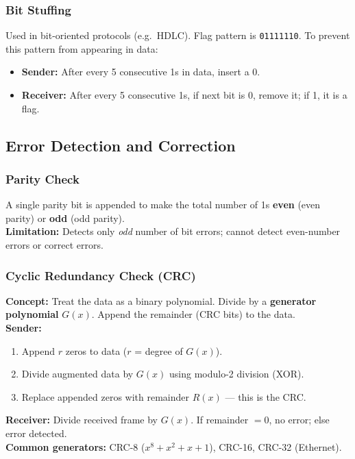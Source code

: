 \documentclass[12pt,a4paper]{article}
\begin{document}
\subsubsection*{Bit Stuffing}
Used in bit-oriented protocols (e.g.\ HDLC). Flag pattern is \texttt{01111110}. To prevent this pattern from appearing in data:
\begin{itemize}[leftmargin=*, itemsep=2pt]
  \item \textbf{Sender:} After every 5 consecutive 1s in data, insert a 0.
  \item \textbf{Receiver:} After every 5 consecutive 1s, if next bit is 0, remove it; if 1, it is a flag.
\end{itemize}

\subsection{Error Detection and Correction}

\subsubsection*{Parity Check}
\begin{tcolorbox}[formulabox, title={\textbf{Parity Check}}]
A single parity bit is appended to make the total number of 1s \textbf{even} (even parity) or \textbf{odd} (odd parity).\\
\textbf{Limitation:} Detects only \textit{odd} number of bit errors; cannot detect even-number errors or correct errors.
\end{tcolorbox}

\subsubsection*{Cyclic Redundancy Check (CRC)}
\begin{tcolorbox}[formulabox, title={\textbf{CRC --- Most Widely Used Error Detection}}]
\textbf{Concept:} Treat the data as a binary polynomial. Divide by a \textbf{generator polynomial} $G(x)$. Append the remainder (CRC bits) to the data.\\[4pt]
\textbf{Sender:}
\begin{enumerate}[label=\arabic*., leftmargin=*, itemsep=2pt, topsep=0pt]
  \item Append $r$ zeros to data ($r$ = degree of $G(x)$).
  \item Divide augmented data by $G(x)$ using modulo-2 division (XOR).
  \item Replace appended zeros with remainder $R(x)$ --- this is the CRC.
\end{enumerate}
\textbf{Receiver:} Divide received frame by $G(x)$. If remainder $= 0$, no error; else error detected.\\[4pt]
\textbf{Common generators:} CRC-8 ($x^8+x^2+x+1$), CRC-16, CRC-32 (Ethernet).
\end{tcolorbox}
\end{document}
